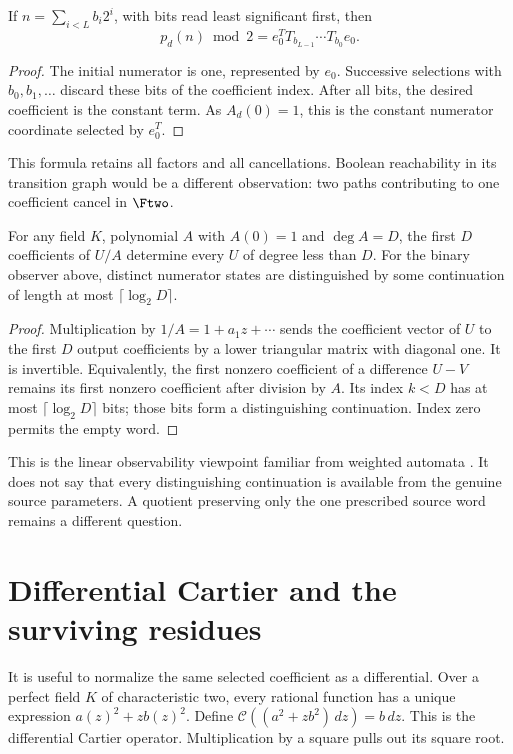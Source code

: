 \documentclass[11pt]{article}
\begin{document}
\begin{theorem}\label{thm:observer}
If $n=\sum_{i<L}b_i2^i$, with bits read least significant first,
then
\[
 p_d(n)\bmod2=e_0^{T}T_{b_{L-1}}\cdots T_{b_0}e_0.
\]
\end{theorem}
\begin{proof}
The initial numerator is one, represented by $e_0$. Successive
selections with $b_0,b_1,\ldots$ discard these bits of the
coefficient index. After all bits, the desired coefficient is the
constant term. As $A_d(0)=1$, this is the constant numerator
coordinate selected by $e_0^T$.
\end{proof}

This formula retains all factors and all cancellations. Boolean
reachability in its transition graph would be a different observation:
two paths contributing to one coefficient cancel in $\Ftwo$.

\begin{lemma}\label{lem:observable}
For any field $K$, polynomial $A$ with $A(0)=1$ and $\deg A=D$,
the first $D$ coefficients of $U/A$ determine every $U$ of degree
less than $D$. For the binary observer above, distinct numerator
states are distinguished by some continuation of length at most
$\lceil\log_2 D\rceil$.
\end{lemma}
\begin{proof}
Multiplication by $1/A=1+a_1z+\cdots$ sends the coefficient
vector of $U$ to the first $D$ output coefficients by a lower
triangular matrix with diagonal one. It is invertible. Equivalently,
the first nonzero coefficient of a difference $U-V$ remains its
first nonzero coefficient after division by $A$. Its index $k<D$
has at most $\lceil\log_2D\rceil$ bits; those bits form a
distinguishing continuation. Index zero permits the empty word.
\end{proof}

This is the linear observability viewpoint familiar from weighted
automata \cite{kiefer}. It does not say that every distinguishing
continuation is available from the genuine source parameters.
A quotient preserving only the one prescribed source word remains a
different question.

\section{Differential Cartier and the surviving residues}

It is useful to normalize the same selected coefficient as a differential.
Over a perfect field $K$ of characteristic two, every rational function
has a unique expression $a(z)^2+zb(z)^2$. Define
$\mathcal C((a^2+zb^2)\,dz)=b\,dz$.
This is the differential Cartier operator. Multiplication by a square
pulls out its square root.
\end{document}
